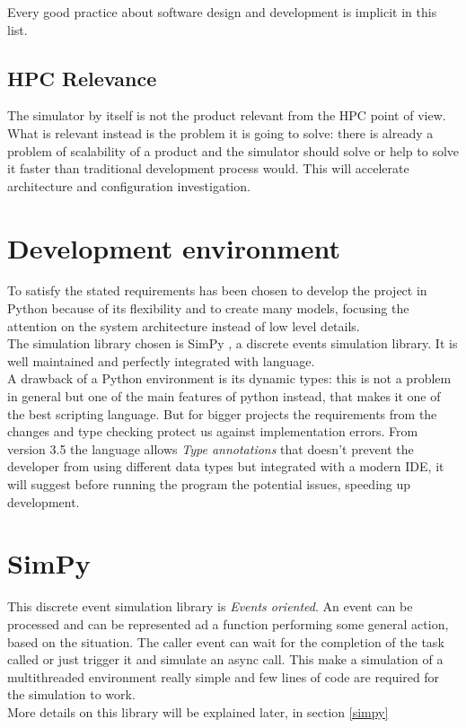Every good practice about software design and development is implicit in this
list.

\subsection{HPC Relevance}
The simulator by itself is not the product relevant from the HPC point of view.
What is relevant instead is the problem it is going to solve: there is already a
problem of scalability of a product and the simulator should solve or help to
solve it faster than traditional development process would. This will accelerate
architecture and configuration investigation.

\section{Development environment}
To satisfy the stated requirements has been chosen to develop the project in Python
because of its flexibility and to create many models, focusing the attention on the
system architecture instead of low level details. \\
The simulation library chosen is SimPy \cite{simpy}, a discrete events
simulation library. It is well maintained and perfectly integrated with
language. \\
A drawback of a Python environment is its dynamic types: this is not a problem
in general but one of the main features of python instead, that makes it one of
the best scripting language. But for bigger projects the requirements from the
changes and type checking protect us against implementation errors. From version
3.5 the language allows \textit{Type annotations} that doesn't prevent the
developer from using different data types but integrated with a modern IDE, it
will suggest before running the program the potential issues, speeding up
development.

\section{SimPy}
This discrete event simulation library is \textit{Events oriented}. An event can
be processed and can be represented ad a function performing some general
action, based on the situation. The caller event can wait for the completion of
the task called or just trigger it and simulate an async call. This make a
simulation of a multithreaded environment really simple and few lines of code
are required for the simulation to work. \\
More details on this library will be explained later, in section \ref{simpy}

